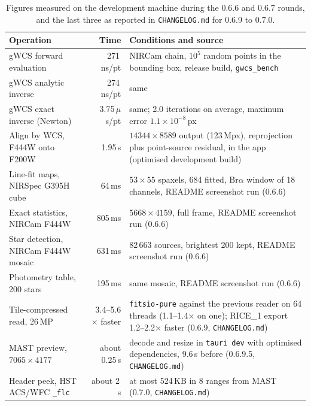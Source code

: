 \documentclass[11pt,a4paper]{article}
\newcommand{\code}[1]{\texttt{\small #1}}
\newcommand{\crate}[1]{\texttt{#1}}
\begin{document}
    \begin{table}[H]
        \centering
        \small
        \begin{tabularx}{\textwidth}{lrX}
            \toprule
            \textbf{Operation} & \textbf{Time} & \textbf{Conditions and source} \\
            \midrule
            gWCS forward evaluation & 271\,ns/pt & NIRCam chain, $10^5$ random points in the bounding box, release build, \code{gwcs\_bench} \\
            gWCS analytic inverse & 274\,ns/pt & same \\
            gWCS exact inverse (Newton) & 3.75\,$\mu$s/pt & same; 2.0 iterations on average, maximum error $1.1 \times 10^{-8}$\,px \\
            Align by WCS, F444W onto F200W & 1.95\,s & $14344 \times 8589$ output (123\,Mpx), reprojection plus point-source residual, in the app (optimised development build) \\
            Line-fit maps, NIRSpec G395H cube & 64\,ms & $53 \times 55$ spaxels, 684 fitted, Br$\alpha$ window of 18 channels, README screenshot run (0.6.6) \\
            Exact statistics, NIRCam F444W & 805\,ms & $5668 \times 4159$, full frame, README screenshot run (0.6.6) \\
            Star detection, NIRCam F444W mosaic & 631\,ms & 82\,663 sources, brightest 200 kept, README screenshot run (0.6.6) \\
            Photometry table, 200 stars & 195\,ms & same mosaic, README screenshot run (0.6.6) \\
            Tile-compressed read, 26\,MP & 3.4--5.6$\times$ faster & \crate{fitsio-pure} against the previous reader on 64 threads (1.1--1.4$\times$ on one); RICE\_1 export 1.2--2.2$\times$ faster (0.6.9, \code{CHANGELOG.md}) \\
            MAST preview, $7065 \times 4177$ & about 0.25\,s & decode and resize in \code{tauri dev} with optimised dependencies, 9.6\,s before (0.6.9.5, \code{CHANGELOG.md}) \\
            Header peek, HST ACS/WFC \code{\_flc} & about 2\,s & at most 524\,KB in 8 ranges from MAST (0.7.0, \code{CHANGELOG.md}) \\
            \bottomrule
        \end{tabularx}
        \caption{Figures measured on the development machine during the 0.6.6 and 0.6.7 rounds, and the last three as reported in \code{CHANGELOG.md} for 0.6.9 to 0.7.0.}
    \end{table}
\end{document}

